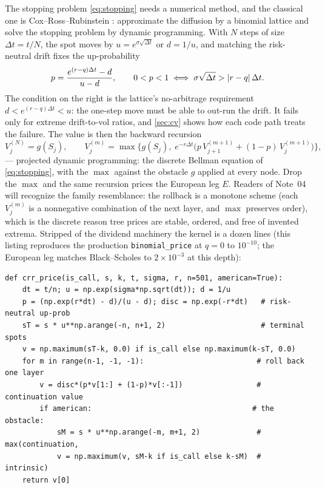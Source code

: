\documentclass[11pt]{article}
\begin{document}
The stopping problem \eqref{eq:stopping} needs a numerical method, and the
classical one is Cox--Ross--Rubinstein \cite{CoxRossRubinstein1979}:
approximate the diffusion by a binomial lattice and solve the stopping
problem by dynamic programming.  With $N$ steps of size $\Delta t=t/N$,
the spot moves by $u=e^{\sigma\sqrt{\Delta t}}$ or $d=1/u$, and matching
the risk-neutral drift fixes the up-probability
\begin{equation}
p=\frac{e^{(r-q)\Delta t}-d}{u-d},
\qquad 0<p<1
\iff \sigma\sqrt{\Delta t}>\lvert r-q\rvert\,\Delta t .
\label{eq:crr_p}
\end{equation}
The condition on the right is the lattice's no-arbitrage requirement
$d<e^{(r-q)\Delta t}<u$: the one-step move must be able to out-run the
drift.  It fails only for extreme drift-to-vol ratios, and
\cref{sec:cv} shows how each code path treats the failure.  The value is
then the backward recursion
\begin{equation}
V^{(N)}_j=g(S_j),\qquad
V^{(m)}_j=\max\Big\{g(S_j),\;
e^{-r\Delta t}\big(p\,V^{(m+1)}_{j+1}+(1-p)\,V^{(m+1)}_{j}\big)\Big\},
\label{eq:rollback}
\end{equation}
--- projected dynamic programming: the discrete Bellman equation of
\eqref{eq:stopping}, with the $\max$ against the obstacle $g$ applied at
every node.  Drop the $\max$ and the same recursion prices the European
leg $E$.  Readers of Note~04 will recognize the family resemblance: the
rollback is a monotone scheme (each $V^{(m)}_j$ is a nonnegative
combination of the next layer, and $\max$ preserves order), which is the
discrete reason tree prices are stable, ordered, and free of invented
extrema.  Stripped of the dividend machinery the kernel is a dozen lines
(this listing reproduces the production \texttt{binomial\_price} at $q=0$
to $10^{-10}$; the European leg matches Black--Scholes to $2\times10^{-3}$
at this depth):

\begin{lstlisting}[caption={The CRR backward induction with early exercise
(distilled from \texttt{core/american.py}).},label={lst:crr}]
def crr_price(is_call, s, k, t, sigma, r, n=501, american=True):
    dt = t/n; u = np.exp(sigma*np.sqrt(dt)); d = 1/u
    p = (np.exp(r*dt) - d)/(u - d); disc = np.exp(-r*dt)   # risk-neutral up-prob
    sT = s * u**np.arange(-n, n+1, 2)                      # terminal spots
    v = np.maximum(sT-k, 0.0) if is_call else np.maximum(k-sT, 0.0)
    for m in range(n-1, -1, -1):                          # roll back one layer
        v = disc*(p*v[1:] + (1-p)*v[:-1])                 # continuation value
        if american:                                     # the obstacle:
            sM = s * u**np.arange(-m, m+1, 2)             #   max(continuation,
            v = np.maximum(v, sM-k if is_call else k-sM)  #       intrinsic)
    return v[0]
\end{lstlisting}
\end{document}
